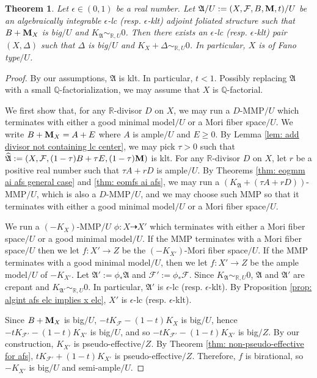 \documentclass[12pt]{amsart}
\numberwithin{equation}{section}
\newcommand{\Mm}{{\bf{M}}}
\newcommand{\Rr}{\mathbb{R}}
\newcommand{\Aa}{{\mathfrak{A}}}
\newcommand{\Ff}{\mathcal{F}}
\newtheorem{thm}{Theorem}[section]
\theoremstyle{definition}
\theoremstyle{definition}
\theoremstyle{definition}
\begin{document}
\begin{thm}\label{thm: precise fano type afs to x}
    Let $\epsilon\in (0,1)$ be a real number. Let $\Aa/U:=(X,\Ff,B,\Mm,t)/U$ be an algebraically integrable $\epsilon$-lc (resp. $\epsilon$-klt) adjoint foliated structure such that $B+\Mm_X$ is big$/U$ and $K_{\Aa}\sim_{\mathbb R,U}0$. Then there exists an $\epsilon$-lc (resp. $\epsilon$-klt) pair $(X,\Delta)$ such that $\Delta$ is big$/U$ and $K_X+\Delta\sim_{\mathbb R,U}0$. In particular, $X$ is of Fano type$/U$.
\end{thm}
\begin{proof}
    By our assumptions, $\Aa$ is klt. In particular, $t<1$. Possibly replacing $\Aa$ with a small $\mathbb Q$-factorialization, we may assume that $X$ is $\mathbb Q$-factorial. 

We first show that, for any $\Rr$-divisor $D$ on $X$, we may run a $D$-MMP$/U$ which terminates with either a good minimal model$/U$ or a Mori fiber space$/U$. We write $B+\Mm_X=A+E$ where $A$ is ample$/U$ and $E\geq 0$. By Lemma \ref{lem: add divisor not containing lc center}, we may pick $\tau>0$ such that $\widehat{\Aa}:=(X,\Ff,(1-\tau)B+\tau E,(1-\tau)\Mm)$ is klt. For any $\Rr$-divisor $D$ on $X$, let $r$ be a positive real number such that $\tau A+rD$ is ample$/U$. By Theorems \ref{thm: eogmm ai afs general case} and \ref{thm: eomfs ai afs}, we may run a $(K_{\Aa}+(\tau A+rD))$-MMP$/U$,  which is also a $D$-MMP$/U$, and we may choose such MMP so that it terminates with either a good minimal model$/U$ or a Mori fiber space$/U$.

We run a $(-K_X)$-MMP$/U$ $\phi: X\dashrightarrow X'$ which terminates with either a Mori fiber space$/U$ or a good minimal model$/U$. If the MMP terminates with a Mori fiber space$/U$ then we let $f: X'\rightarrow Z$ be the $(-K_{X'})$-Mori fiber space$/U$. If the MMP terminates with a good minimal model$/U$, then we let $f: X'\rightarrow Z$ be the ample model$/U$ of $-K_{X'}$. Let $\Aa':=\phi_*\Aa$ and $\Ff':=\phi_*\Ff$. Since $K_{\Aa}\sim_{\mathbb R,U}0$, $\Aa$ and $\Aa'$ are crepant and $K_{\Aa'}\sim_{\mathbb R,U}0$. In particular, $\Aa'$ is $\epsilon$-lc (resp. $\epsilon$-klt). By Proposition \ref{prop: algint afs elc implies x elc}, $X'$ is $\epsilon$-lc (resp. $\epsilon$-klt). 

Since $B+\Mm_X$ is big$/U$, $-tK_{\Ff}-(1-t)K_X$ is big$/U$, hence $-tK_{\Ff'}-(1-t)K_{X'}$ is big$/U$, and so $-tK_{\Ff'}-(1-t)K_{X'}$ is big$/Z$. By our construction, $K_{X'}$ is pseudo-effective$/Z$. By Theorem \ref{thm: non-pseudo-effective for afs}, $tK_{\Ff'}+(1-t)K_{X'}$ is pseudo-effective$/Z$. Therefore, $f$ is birational, so $-K_{X'}$ is big$/U$ and semi-ample$/U$. 


\end{proof}
\end{document}
